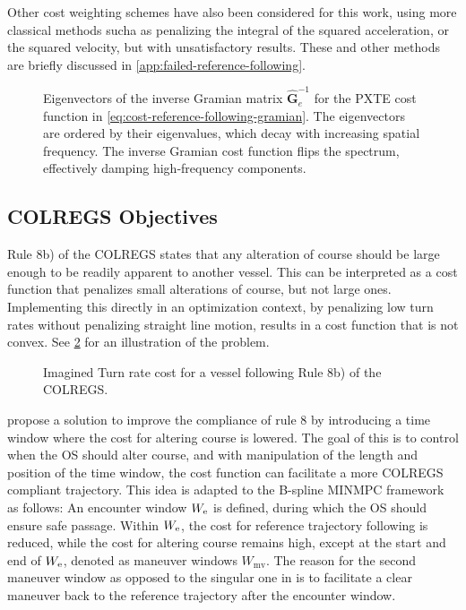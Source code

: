 Other cost weighting schemes have also been considered for this work, using more classical methods sucha as penalizing the integral of the squared acceleration, or the squared velocity, but with unsatisfactory results. These and other methods are briefly discussed in \cref{app:failed-reference-following}.

\begin{figure}
    \centering
    
    \caption{Eigenvectors of the inverse Gramian matrix $\mathbf{\hat G}_e^{-1}$ for the PXTE cost function in \cref{eq:cost-reference-following-gramian}. The eigenvectors are ordered by their eigenvalues, which decay with increasing spatial frequency. The inverse Gramian cost function flips the spectrum, effectively damping high‐frequency components.}    
    \label{fig:inverse-gramian-eigenvectors}
\end{figure}


\FloatBarrier
\subsection{COLREGS Objectives}\label{sec:colregs-objectives}
Rule 8b) of the COLREGS states that any alteration of course should be large enough to be readily apparent to another vessel. 
This can be interpreted as a cost function that penalizes small alterations of course, but not large ones. 
Implementing this directly in an optimization context, by penalizing low turn rates without penalizing straight line motion, results in a cost function that is not convex. 
See \cref{fig:turn-rate-cost} for an illustration of the problem.

\begin{figure}
    \centering
    
    \caption{Imagined Turn rate cost for a vessel following Rule 8b) of the COLREGS.}
    \label{fig:turn-rate-cost}
\end{figure}

\cite{Thyri2022-MPC} propose a solution to improve the compliance of rule 8 by introducing a time window where the cost for altering course is lowered. The goal of this is to control when the OS should alter course, and with manipulation of the length and position of the time window, the cost function can facilitate a more COLREGS compliant trajectory. This idea is adapted to the B-spline MINMPC framework as follows:
An encounter window $W_\text e$ is defined, during which the OS should ensure safe passage. Within $W_\text e$, the cost for reference trajectory following is reduced, while the cost for altering course remains high, except at the start and end of $W_\text e$, denoted as maneuver windows $W_\text{mv}$. 
The reason for the second maneuver window as opposed to the singular one in \cite{Thyri2022-MPC} is to facilitate a clear maneuver back to the reference trajectory after the encounter window.

